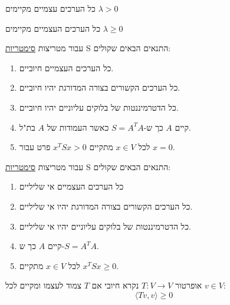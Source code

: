 \documentclass{tstextbook}
\begin{document}
\begin{definition}
כל הערכים עצמיים מקיימים \(\lambda >0\)

\end{definition}
\begin{definition}
כל הערכים העצמיים מקיימים \(\lambda \geq 0\)

\end{definition}
\begin{proposition}
עבור מטריצות \underline{סימטריות} S התנאים הבאים שקולים:

  \begin{enumerate}
    \item כל הערכים העצמיים חיוביים. 


    \item כל הערכים הקשורים בצורה המדורגת יהיו חיוביים. 


    \item כל הדטרמיננטות של בלוקים עליוניים יהיו חיוביים. 


    \item קיים \(A\) כך ש-\(S=A^{ T}A\) כאשר העמודות של \(A\) בת"ל. 


    \item לכל \(x \in V\) מתקיים \(x^{T}Sx > 0\) פרט עבור \(x=0\). 


  \end{enumerate}
\end{proposition}
\begin{proposition}
עבור מטריצות \underline{סימטריות} S התנאים הבאים שקולים:

  \begin{enumerate}
    \item כל הערכים העצמיים אי שליליים 


    \item כל הערכים הקשורים בצורה המדורגת יהיו אי שליליים. 


    \item כל הדטרמיננטות של בלוקים עליוניים יהיו אי שליליים. 


    \item קיים \(A\) כך ש-\(S=A^{ T}A\). 


    \item לכל \(x \in V\) מתקיים \(x^{T}Sx \geq 0\). 


  \end{enumerate}
\end{proposition}
\begin{definition}
אופרטור \(T:V\to V\) נקרא חיובי אם \(T\) צמוד לעצמו ומקיים לכל \(v \in V\):
$$\langle Tv,v \rangle \geq 0$$

\end{definition}
\end{document}
